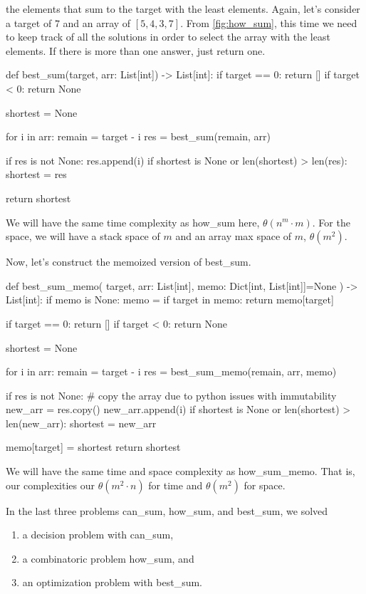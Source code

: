 \documentclass[12pt,dvipsnames,svgnames,x11names]{article}
\begin{document}
the elements that sum to the target with the least elements. Again, let's consider a target of \(7\) and an
array of \([5, 4, 3, 7]\). From \cref{fig:how_sum}, this time we need to keep track of all the solutions in
order to select the array with the least elements. If there is more than one answer, just return one.
\begin{python}
def best_sum(target, arr: List[int]) -> List[int]:
  if target == 0:
    return []
  if target < 0:
    return None
    
  shortest = None
    
  for i in arr:
    remain = target - i
    res = best_sum(remain, arr)
        
    if res is not None:
      res.append(i)
      if shortest is None or len(shortest) > len(res):
        shortest = res
                
  return shortest
\end{python}
We will have the same time complexity as how\_sum here, \(\theta(n^m\cdot m)\). For the space, we will
have a stack space of \(m\) and an array max space of \(m\), \(\theta (m^2)\).
\par\medskip
Now, let's construct the memoized version of best\_sum.
\begin{python}
def best_sum_memo(
    target, 
    arr: List[int], 
    memo: Dict[int, List[int]]=None
    ) -> List[int]:
  if memo is None:
    memo = {}
  if target in memo:
    return memo[target]
    
  if target == 0:
    return []
  if target < 0:
    return None
    
  shortest = None
    
  for i in arr:
    remain = target - i
    res = best_sum_memo(remain, arr, memo)
        
    if res is not None:
      # copy the array due to python issues with immutability
       new_arr = res.copy()
       new_arr.append(i)
       if shortest is None or len(shortest) > len(new_arr):
         shortest = new_arr
                
  memo[target] = shortest   
  return shortest
\end{python}
We will have the same time and space complexity as how\_sum\_memo. That is, our complexities our
\(\theta (m^2\cdot n)\) for time and \(\theta (m^2)\) for space.
\par\medskip
In the last three problems can\_sum, how\_sum, and best\_sum, we solved
\begin{enumerate}
	\item a decision problem with can\_sum,
	\item a combinatoric problem how\_sum, and
	\item an optimization problem with best\_sum.
\end{enumerate}
\end{document}
